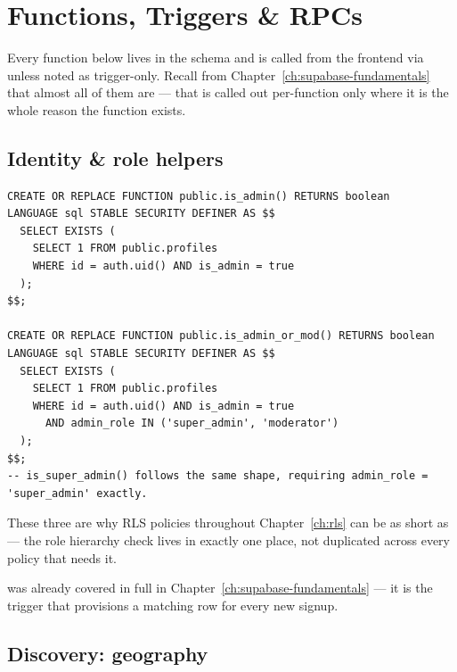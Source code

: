 \chapter{Functions, Triggers \& RPCs}
\label{ch:functions}

Every function below lives in the  schema and is called from the frontend via  unless noted as trigger-only. Recall from Chapter~\ref{ch:supabase-fundamentals} that almost all of them are  — that is called out per-function only where it is the whole reason the function exists.

\section{Identity \& role helpers}

\begin{lstlisting}[style=olkcodesql, caption={The three functions every admin RLS policy is built from (supabase/schema.sql)}]
CREATE OR REPLACE FUNCTION public.is_admin() RETURNS boolean
LANGUAGE sql STABLE SECURITY DEFINER AS $$
  SELECT EXISTS (
    SELECT 1 FROM public.profiles
    WHERE id = auth.uid() AND is_admin = true
  );
$$;

CREATE OR REPLACE FUNCTION public.is_admin_or_mod() RETURNS boolean
LANGUAGE sql STABLE SECURITY DEFINER AS $$
  SELECT EXISTS (
    SELECT 1 FROM public.profiles
    WHERE id = auth.uid() AND is_admin = true
      AND admin_role IN ('super_admin', 'moderator')
  );
$$;
-- is_super_admin() follows the same shape, requiring admin_role = 'super_admin' exactly.
\end{lstlisting}

These three are why RLS policies throughout Chapter~\ref{ch:rls} can be as short as  — the role hierarchy check lives in exactly one place, not duplicated across every policy that needs it.

 was already covered in full in Chapter~\ref{ch:supabase-fundamentals} — it is the  trigger that provisions a matching  row for every new signup.

\section{Discovery: geography}

